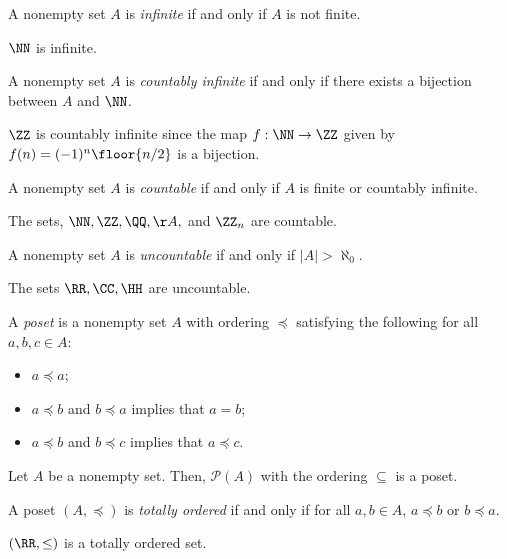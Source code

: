 \begin{definition*}
	A nonempty set $A$ is \textit{infinite} if and only if $A$ is not finite.
\end{definition*}
\begin{example*}
	$\NN$ is infinite.
\end{example*}

\begin{definition*}
	A nonempty set $A$ is \textit{countably infinite} if and only if there exists a bijection between $A$ and $\NN$.
\end{definition*}
\begin{example*}
	$\ZZ$ is countably infinite since the map $f:\NN\rightarrow\ZZ$ given by $f(n)=(-1)^n\floor{n/2}$ is a bijection.
\end{example*}

\begin{definition*}
	A nonempty set $A$ is \textit{countable} if and only if $A$ is finite or countably infinite.
\end{definition*}
\begin{example*}
	The sets, $\NN,\ZZ,\QQ,\AA,$ and $\ZZ_n$ are countable.
\end{example*}

\begin{definition*}
	A nonempty set $A$ is \textit{uncountable} if and only if $|A|>\aleph_0$.
\end{definition*}
\begin{example*}
	The sets $\RR,\CC,\HH$ are uncountable.
\end{example*}

\begin{definition*}
	A \textit{poset} is a nonempty set $A$ with ordering $\preceq$ satisfying the following for all $a,b,c\in A$:
	\begin{itemize}
		\item $a\preceq a$;
		\item $a\preceq b$ and $b\preceq a$ implies that $a=b$;
		\item $a\preceq b$ and $b\preceq c$ implies that $a\preceq c$.
	\end{itemize}
\end{definition*}
\begin{example*}
	Let $A$ be a nonempty set.
	Then, $\mathcal{P}(A)$ with the ordering $\subseteq$ is a poset.
\end{example*}

\begin{definition*}
	A poset $(A,\preceq)$ is \textit{totally ordered} if and only if for all $a,b\in A$, $a\preceq b$ or $b\preceq a$.
\end{definition*}
\begin{example*}
	$(\RR, \leq)$ is a totally ordered set.
\end{example*}

